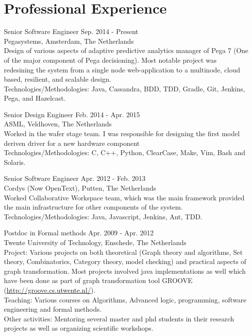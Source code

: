 \section{Professional Experience}

Senior Software Engineer \hfill Sep. 2014 - Present \\
Pegasystems, Amsterdam, The Netherlands \\
Design of various aspects of adaptive predictive analytics manager of Pega 7 (One of the major component of Pega decisioning). Most notable project was redesining the system from a single node web-application to a multinode, cloud based, resilient, and scalable design. \\
Technologies/Methodologies: Java, Cassandra, BDD, TDD, Gradle, Git, Jenkins, Pega, and Hazelcast.

Senior Design Engineer  \hfill Feb. 2014 - Apr. 2015 \\
ASML, Veldhoven, The Netherlands \\
Worked in the wafer stage team. I was responsible for designing the first model deriven driver for a new hardware component \\
Technologies/Methodologies: C, C++, Python, ClearCase, Make, Vim, Bash and Solaris.

Senior Software Engineer  \hfill Apr. 2012 - Feb. 2013 \\
Cordys (Now OpenText), Putten, The Netherlands \\
Worked Collaborative Workspace team, which was the main framework provided the main infrastructure for other components of the system. \\
Technologies/Methodologies: Java, Javascript, Jenkins, Ant, TDD.

Postdoc in Formal methods  \hfill Apr. 2009 - Apr. 2012 \\
Twente University of Technology, Enschede, The Netherlands  \\
\ifindustry
Project: Various projects on both theoretical (Graph theory and algorithms, Set theory, Combinatorics, Category theory, model checking) and practical aspects of graph transformation. 
Most projects involved java implementations as well which have been done as part of graph transformation tool GROOVE (\url{http://groove.cs.utwente.nl/}).  \\
Teaching: Various courses on Algorithms, Advanced logic, programming, software engineering and formal methods. \\
Other activities: Mentoring several master and phd students in their research projects as well as organizing scientific workshops.
\fi


